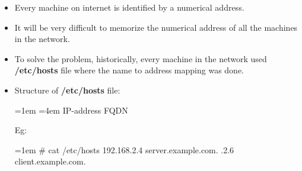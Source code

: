 \setlength{\columnsep}{3pt}
\begin{flushleft}
	\bigskip
	\begin{itemize}
		\item Every machine on internet is identified by a numerical address.
		\item It will be very difficult to memorize the numerical address of all the machines in the network. 
		\item To solve the problem, historically, every machine in the network used \textbf{/etc/hosts} file where the name to address mapping was done.
		\item Structure of \textbf{/etc/hosts} file:
		\begin{tcolorbox}[breakable,notitle,boxrule=1pt,colback=pink,colframe=pink]
			\color{black}
			\font=1em
			\newline
			\font=4em
			IP-address      FQDN
			\font=4pt
		\end{tcolorbox}	
	
		Eg:
		
		\begin{tcolorbox}[breakable,notitle,boxrule=-0pt,colback=black,colframe=black]
			\color{green}
			\font=1em
			\# cat /etc/hosts
			\newline
			\color{white}
			192.168.2.4   server.example.com.
			.2.6	  client.example.com.
			\font=4pt
		\end{tcolorbox}
		
	\end{itemize}
\end{flushleft}

\newpage





